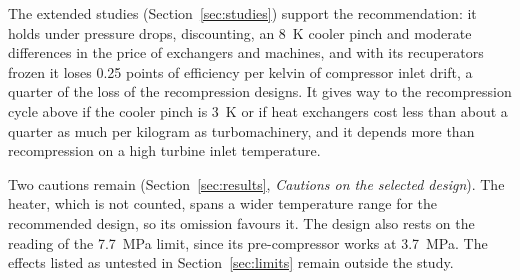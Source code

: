 The extended studies (Section~\ref{sec:studies}) support the recommendation: it holds under pressure drops, discounting, an \SI{8}{K} cooler pinch and moderate differences in the price of exchangers and machines, and with its recuperators frozen it loses 0.25 points of efficiency per kelvin of compressor inlet drift, a quarter of the loss of the recompression designs. It gives way to the recompression cycle above if the cooler pinch is \SI{3}{K} or if heat exchangers cost less than about a quarter as much per kilogram as turbomachinery, and it depends more than recompression on a high turbine inlet temperature.

Two cautions remain (Section~\ref{sec:results}, \emph{Cautions on the selected design}). The heater, which is not counted, spans a wider temperature range for the recommended design, so its omission favours it. The design also rests on the reading of the \SI{7.7}{MPa} limit, since its pre-compressor works at \SI{3.7}{MPa}. The effects listed as untested in Section~\ref{sec:limits} remain outside the study.
